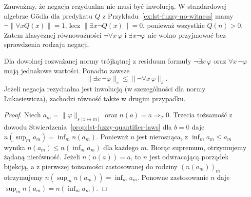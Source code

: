 Zauważmy, że negacja rezydualna nie musi być inwolucją.
W standardowej algebrze Gödla dla predykatu $Q$
z Przykładu~\ref{ex:lst-fuzzy-no-witness} mamy $\neg\|\forall xQ(x)\|=1$,
lecz $\|\exists x\neg Q(x)\|=0$, ponieważ wszystkie $Q(n)>0$.
Zatem klasycznej równoważności
$\neg\forall x\,\varphi$ i $\exists x\neg\varphi$
nie wolno przyjmować bez sprawdzenia rodzaju negacji.

\begin{stwierdzenie}
\label{prop:ncl-quantifier-negation}
Dla dowolnej rozważanej normy trójkątnej z residuum
formuły $\neg\exists x\,\varphi$ oraz $\forall x\,\neg\varphi$
mają jednakowe wartości. Ponadto zawsze
\[
 \|\exists x\,\neg\varphi\|_s\leq
 \|\neg\forall x\,\varphi\|_s.
\]
Jeżeli negacja rezydualna jest inwolucją (w szczególności
dla normy Łukasiewicza), zachodzi równość także
w drugim przypadku.
\end{stwierdzenie}
\begin{proof}
Niech $a_m=\|\varphi\|_{s[x\mapsto m]}$ oraz $n(a)=a\Rightarrow_T0$.
Trzecia tożsamość z dowodu
Stwierdzenia~\ref{prop:lst-fuzzy-quantifier-laws}
dla $b=0$ daje $n(\sup_m a_m)=\inf_m n(a_m)$.
Ponieważ $n$ jest nierosnąca, z $\inf_m a_m\leq a_m$
wynika $n(a_m)\leq n(\inf_m a_m)$ dla każdego $m$.
Biorąc supremum, otrzymujemy żądaną nierówność.
Jeżeli $n(n(a))=a$, to $n$ jest odwracającą porządek
bijekcją, a z pierwszej tożsamości zastosowanej do
rodziny $(n(a_m))_m$ otrzymujemy
$n(\sup_m n(a_m))=\inf_m a_m$.
Ponowne zastosowanie $n$ daje
$\sup_m n(a_m)=n(\inf_m a_m)$.
\end{proof}

